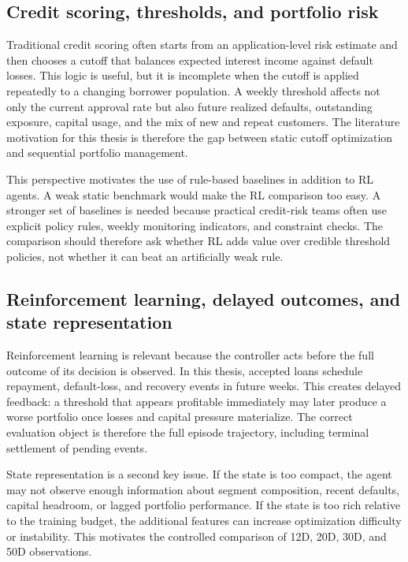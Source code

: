 \documentclass[12pt,a4paper]{article}
\begin{document}
\subsection{Credit scoring, thresholds, and portfolio risk}

Traditional credit scoring often starts from an application-level risk estimate and then chooses a cutoff that balances expected interest income against default losses. This logic is useful, but it is incomplete when the cutoff is applied repeatedly to a changing borrower population. A weekly threshold affects not only the current approval rate but also future realized defaults, outstanding exposure, capital usage, and the mix of new and repeat customers. The literature motivation for this thesis is therefore the gap between static cutoff optimization and sequential portfolio management.

This perspective motivates the use of rule-based baselines in addition to RL agents. A weak static benchmark would make the RL comparison too easy. A stronger set of baselines is needed because practical credit-risk teams often use explicit policy rules, weekly monitoring indicators, and constraint checks. The comparison should therefore ask whether RL adds value over credible threshold policies, not whether it can beat an artificially weak rule.

\subsection{Reinforcement learning, delayed outcomes, and state representation}

Reinforcement learning is relevant because the controller acts before the full outcome of its decision is observed. In this thesis, accepted loans schedule repayment, default-loss, and recovery events in future weeks. This creates delayed feedback: a threshold that appears profitable immediately may later produce a worse portfolio once losses and capital pressure materialize. The correct evaluation object is therefore the full episode trajectory, including terminal settlement of pending events.

State representation is a second key issue. If the state is too compact, the agent may not observe enough information about segment composition, recent defaults, capital headroom, or lagged portfolio performance. If the state is too rich relative to the training budget, the additional features can increase optimization difficulty or instability. This motivates the controlled comparison of 12D, 20D, 30D, and 50D observations.
\end{document}
